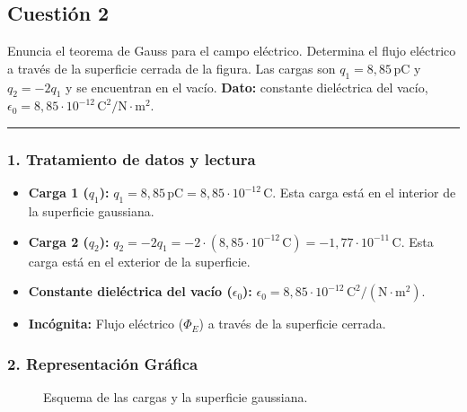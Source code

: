 \subsection{Cuestión 2}
\label{subsec:C2_2021_jun_ord}

\begin{cajaenunciado}
Enuncia el teorema de Gauss para el campo eléctrico. Determina el flujo eléctrico a través de la superficie cerrada de la figura.
Las cargas son $q_{1}=8,85\,\text{pC}$ y $q_{2}=-2q_{1}$ y se encuentran en el vacío.
\textbf{Dato:} constante dieléctrica del vacío, $\epsilon_{0}=8,85\cdot10^{-12}\,\text{C}^2/\text{N}\cdot\text{m}^2$.
\end{cajaenunciado}
\hrule

\subsubsection*{1. Tratamiento de datos y lectura}
\begin{itemize}
    \item \textbf{Carga 1 ($q_1$):} $q_1 = 8,85 \, \text{pC} = 8,85 \cdot 10^{-12} \, \text{C}$. Esta carga está en el interior de la superficie gaussiana.
    \item \textbf{Carga 2 ($q_2$):} $q_2 = -2q_1 = -2 \cdot (8,85 \cdot 10^{-12} \, \text{C}) = -1,77 \cdot 10^{-11} \, \text{C}$. Esta carga está en el exterior de la superficie.
    \item \textbf{Constante dieléctrica del vacío ($\epsilon_0$):} $\epsilon_0 = 8,85 \cdot 10^{-12} \, \text{C}^2/(\text{N}\cdot\text{m}^2)$.
    \item \textbf{Incógnita:} Flujo eléctrico ($\Phi_E$) a través de la superficie cerrada.
\end{itemize}

\subsubsection*{2. Representación Gráfica}
\begin{figure}[H]
    \centering
    \caption{Esquema de las cargas y la superficie gaussiana.}
\end{figure}

